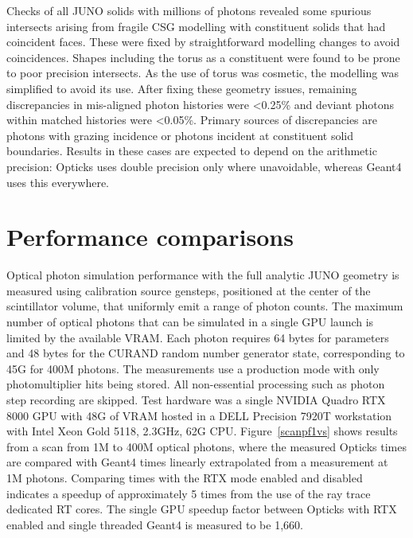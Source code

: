 \documentclass{webofc}
\begin{document}
Checks of all JUNO solids with millions of photons revealed some spurious intersects  
arising from fragile CSG modelling with constituent solids that had coincident faces.  
These were fixed by straightforward modelling changes to avoid coincidences. 
Shapes including the torus as a constituent were found to be prone to poor precision intersects. 
As the use of torus was cosmetic, the modelling was simplified to avoid its use.  
After fixing these geometry issues, remaining discrepancies in mis-aligned photon histories
were <0.25\% and deviant photons within matched histories were <0.05\%. 
Primary sources of discrepancies are photons with grazing incidence or photons incident
at constituent solid boundaries. Results in these cases are expected to depend on the arithmetic precision: Opticks uses double precision 
only where unavoidable, whereas Geant4 uses this everywhere. 
%
%
\section{Performance comparisons}

Optical photon simulation performance with the full analytic JUNO geometry is measured 
using calibration source gensteps, positioned at the center of the scintillator volume, 
that uniformly emit a range of photon counts. 
The maximum number of optical photons that can be simulated in a single GPU launch is
limited by the available VRAM. Each photon requires 64 bytes for parameters  
and 48 bytes for the CURAND random number generator state, corresponding to 45G for 400M photons.
The measurements use a production mode with only photomultiplier hits being stored.
All non-essential processing such as photon step recording are skipped. Test hardware was a single 
NVIDIA Quadro RTX 8000 GPU with 48G of VRAM hosted in a DELL Precision 7920T workstation with 
Intel Xeon Gold 5118, 2.3GHz, 62G CPU. 
Figure~\ref{scanpf1vs} shows results from a scan from 1M to 400M optical photons, where the measured Opticks 
times are compared with Geant4 times linearly extrapolated from a measurement at 1M photons. 
Comparing times with the RTX mode enabled and disabled indicates a speedup of approximately 5 times
from the use of the ray trace dedicated RT cores.
The single GPU speedup factor between Opticks with RTX enabled and single threaded Geant4 
is measured to be 1,660.   
\end{document}
